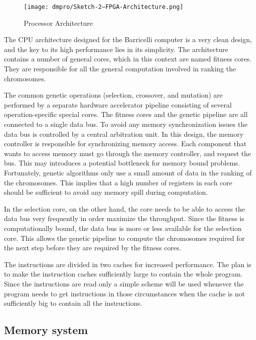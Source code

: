 \begin{figure}[H]
\texttt{[image: dmpro/Sketch-2---FPGA-Architecture.png]}
\caption{Processor Architecture}
\label{figure:fpga-architecture}
\end{figure}

The CPU architecture designed for the Barricelli computer is a very clean design, and the key to its high performance lies in its simplicity.
The architecture contains a number of general cores, which in this context are named fitness cores.
They are responsible for all the general computation involved in ranking the chromosomes.

The common genetic operations (selection, crossover, and mutation) are performed by a separate hardware accelerator pipeline consisting of several operation-specific special cores.
The fitness cores and the genetic pipeline are all connected to a single data bus.
To avoid any memory synchronization issues the data bus is controlled by a central arbitration unit.
In this design, the memory controller is responsible for synchronizing memory access.
Each component that wants to access memory must go through the memory controller, and request the bus.
This may introduces a potential bottleneck for memory bound problems.
Fortunately, genetic algorithms only use a small amount of data in the ranking of the chromosomes.
This implies that a high number of registers in each core should be sufficient to avoid any memory spill during computation.

In the selection core, on the other hand, the core needs to be able to access the data bus very frequently in order maximize the throughput.
Since the fitness is computationally bound, the data bus is more or less available for the selection core.
This allows the genetic pipeline to compute the chromosomes required for the next step before they are required by the fitness cores. 


The instructions are divided in two caches for increased performance.
The plan is to make the instruction caches sufficiently large to contain the whole program.
Since the instructions are read only a simple scheme will be used whenever the program needs to get instructions in those circumstances when the cache is not sufficiently big to contain all the instructions. 


\subsection{Memory system}




